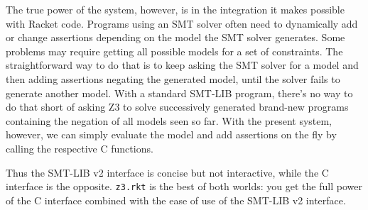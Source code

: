 The true power of the system, however, is in the integration it makes possible
with Racket code. Programs using an SMT solver often need to dynamically add or
change assertions depending on the model the SMT solver generates. Some problems
may require getting all possible models for a set of constraints. The
straightforward way to do that is to keep asking the SMT solver for a model and
then adding assertions negating the generated model, until the solver fails to
generate another model. With a standard SMT-LIB program, there's no way to do
that short of asking Z3 to solve successively generated brand-new programs
containing the negation of all models seen so far. With the present system,
however, we can simply evaluate the model and add assertions on the fly by
calling the respective C functions.

Thus the SMT-LIB v2 interface is concise but not interactive, while the C
interface is the opposite. \texttt{z3.rkt} is the best of both worlds: you get
the full power of the C interface combined with the ease of use of the SMT-LIB
v2 interface.
